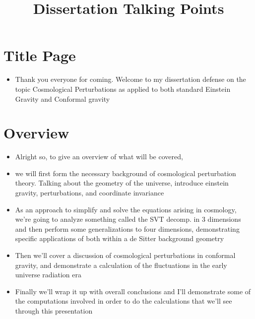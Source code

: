 \documentclass[10pt,letterpaper]{article}
\title{Dissertation Talking Points}
\date{}
\numberwithin{equation}{section}
\begin{document}
 
\maketitle
\noindent 


\section{Title Page}
\begin{itemize}
	\item Thank you everyone for coming. Welcome to my dissertation defense on the topic Cosmological Perturbations as applied to both standard Einstein Gravity and Conformal gravity
\end{itemize}



\section{Overview}
\begin{itemize}
	\item Alright so, to give an overview of what will be covered,
	\item we will first form the necessary background of cosmological perturbation theory. Talking about the geometry of the universe, introduce einstein gravity, perturbations, and coordinate invariance
	\item As an approach to simplify and solve the equations arising in cosmology, we're going to analyze something called the SVT decomp. in 3 dimensions and then perform some generalizations to four dimensions, demonstrating specific applications of both within a de Sitter background geometry
	\item Then we'll cover a discussion of cosmological perturbations in conformal gravity, and demonstrate a calculation of the fluctuations in the early universe radiation era
	\item Finally we'll wrap it up with overall conclusions and I'll demonstrate some of the computations involved in order to do the calculations that we'll see through this presentation
\end{itemize}

\end{document}
